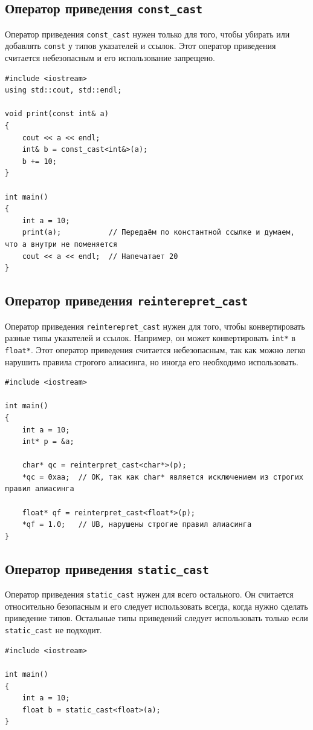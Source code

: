 \documentclass{article}
\begin{document}
\newpage
\subsection*{Оператор приведения \texttt{const\_cast}}
Оператор приведения \texttt{const\_cast} нужен только для того, чтобы убирать или добавлять \texttt{const} у типов указателей и ссылок. Этот оператор приведения считается небезопасным и его использование запрещено.
\begin{lstlisting}
#include <iostream>
using std::cout, std::endl;

void print(const int& a)
{
    cout << a << endl;
    int& b = const_cast<int&>(a);
    b += 10;
}

int main()
{
    int a = 10;
    print(a);           // Передаём по константной ссылке и думаем, что a внутри не поменяется
    cout << a << endl;  // Напечатает 20
}
\end{lstlisting}

\subsection*{Оператор приведения \texttt{reinterepret\_cast}}
Оператор приведения \texttt{reinterepret\_cast} нужен для того, чтобы конвертировать разные типы указателей и ссылок. Например, он может конвертировать \texttt{int*} в \texttt{float*}. Этот оператор приведения считается небезопасным, так как можно легко нарушить правила строгого алиасинга, но иногда его необходимо использовать.
\begin{lstlisting}
#include <iostream>

int main()
{
    int a = 10;
    int* p = &a;
    
    char* qc = reinterpret_cast<char*>(p);
    *qc = 0xaa;  // OK, так как char* является исключением из строгих правил алиасинга
    
    float* qf = reinterpret_cast<float*>(p);
    *qf = 1.0;   // UB, нарушены строгие правил алиасинга
}
\end{lstlisting}

\subsection*{Оператор приведения \texttt{static\_cast}}
Оператор приведения \texttt{static\_cast} нужен для всего остального. Он считается относительно безопасным и его следует использовать всегда, когда нужно сделать приведение типов. Остальные типы приведений следует использовать только если \texttt{static\_cast} не подходит.
\begin{lstlisting}
#include <iostream>

int main()
{
    int a = 10;
    float b = static_cast<float>(a);
}
\end{lstlisting}
\end{document}
